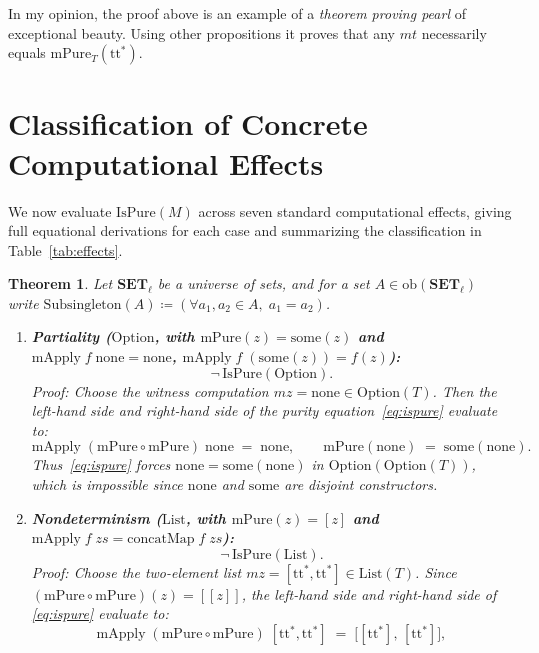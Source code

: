 \documentclass[11pt,a4paper]{article}
\newtheorem{theorem}{Theorem}[section]
\theoremstyle{definition}
\theoremstyle{remark}
\newcommand{\Set}{\mathbf{SET}}
\newcommand{\ttstar}{\mathrm{tt}^*}
\begin{document}
In my opinion, the proof above is an example of a \emph{theorem proving pearl} of
exceptional beauty. Using other propositions it proves that any $mt$ necessarily equals
$\mathrm{mPure}_T(\ttstar)$. 

\section{Classification of Concrete Computational Effects}\label{sec:examples}

We now evaluate $\mathrm{IsPure}(M)$ across seven standard computational effects, giving full
equational derivations for each case and summarizing the classification in Table~\ref{tab:effects}.

\begin{theorem}\label{thm:examples}
Let $\Set_\ell$ be a universe of sets, and for a set $A \in \mathrm{ob}(\Set_\ell)$ write
$\mathrm{Subsingleton}(A) \coloneqq (\forall a_1, a_2 \in A,\; a_1 = a_2)$.
\begin{enumerate}[label=(\arabic*),nosep]
  \item \textbf{Partiality ($\mathrm{Option}$, with $\mathrm{mPure}(z) = \mathrm{some}(z)$ and
  $\mathrm{mApply}\;f\;\mathrm{none} = \mathrm{none}$, $\mathrm{mApply}\;f\;(\mathrm{some}(z)) = f(z)$):}
  \[
    \neg\,\mathrm{IsPure}(\mathrm{Option}).
  \]
  \emph{Proof:} Choose the witness computation $mz = \mathrm{none} \in \mathrm{Option}(T)$. Then the
  left-hand side and right-hand side of the purity equation~\eqref{eq:ispure} evaluate to:
  \[
    \mathrm{mApply}\;(\mathrm{mPure} \circ \mathrm{mPure})\;\mathrm{none} \;=\; \mathrm{none},
    \qquad
    \mathrm{mPure}(\mathrm{none}) \;=\; \mathrm{some}(\mathrm{none}).
  \]
  Thus~\eqref{eq:ispure} forces $\mathrm{none} = \mathrm{some}(\mathrm{none})$ in
  $\mathrm{Option}(\mathrm{Option}(T))$, which is impossible since $\mathrm{none}$ and $\mathrm{some}$
  are disjoint constructors.
  \vspace{4pt}
  \item \textbf{Nondeterminism ($\mathrm{List}$, with $\mathrm{mPure}(z) = [z]$ and
  $\mathrm{mApply}\;f\;zs = \mathrm{concatMap}\;f\;zs$):}
  \[
    \neg\,\mathrm{IsPure}(\mathrm{List}).
  \]
  \emph{Proof:} Choose the two-element list $mz = [\ttstar, \ttstar] \in \mathrm{List}(T)$. Since
  $(\mathrm{mPure} \circ \mathrm{mPure})(z) = [[z]]$, the left-hand side and right-hand side of
  \eqref{eq:ispure} evaluate to:
  \[
    \mathrm{mApply}\;(\mathrm{mPure} \circ \mathrm{mPure})\;[\ttstar, \ttstar]
    \;=\; \bigl[[\ttstar],\, [\ttstar]\bigr],
\]
\end{enumerate}
\end{theorem}
\end{document}
